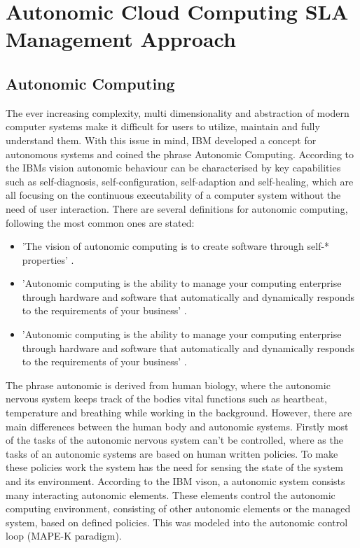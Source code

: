 
\chapter{Autonomic Cloud Computing SLA Management Approach} %
\label{ASLAMaaSApproach} %

\section{Autonomic Computing}
The ever increasing complexity, multi dimensionality and abstraction of modern computer systems make it difficult for users to utilize, maintain and fully understand them. With this issue in mind, IBM  \cite{horn2001autonomic} developed a concept for autonomous systems and coined the phrase Autonomic Computing. According to the IBMs vision autonomic behaviour can be characterised by key capabilities such as self-diagnosis, self-configuration, self-adaption and self-healing, which are all focusing on the continuous executability of a computer system without the need of user interaction. There are several definitions for autonomic computing, following the most common ones are stated:

\begin{itemize} 
\item 'The vision of autonomic computing is to create software through self-* properties'  \cite{sterritt2005autonomic}.
\item 'Autonomic computing is the ability to manage your computing enterprise
through hardware and software that automatically and dynamically responds to the
requirements of your business'  \cite{murch2004autonomic}.
\item 'Autonomic computing is the ability to manage your computing enterprise
through hardware and software that automatically and dynamically responds to the
requirements of your business'  \cite{murch2004autonomic}.
\end{itemize} 

The phrase autonomic is derived from human biology, where the autonomic nervous system keeps track of the bodies vital functions such as heartbeat, temperature and breathing  while working in the background. However, there are main differences between the human body and autonomic systems. Firstly most of the tasks of the autonomic nervous system can't be controlled, where as the tasks of an autonomic systems are based on human written policies.
To make these policies work the system has the need for sensing the state of the system and its environment. According to the IBM vison, a autonomic system consists many interacting autonomic elements. These elements control the autonomic computing environment, consisting of other autonomic elements or the managed system, based on defined policies. This was modeled into the autonomic control loop (MAPE-K paradigm).

